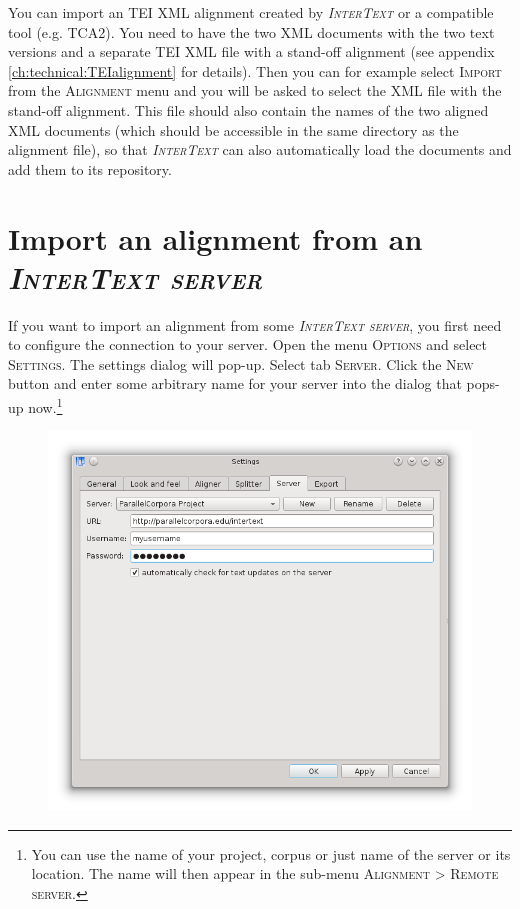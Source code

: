 \documentclass[a4paper,10pt,oneside]{book}
\newcommand{\IT}{\textit{\textsc{InterText}}\xspace}
\newcommand{\ITserver}{\textit{\textsc{InterText server}}\xspace}
\newcommand{\menu}[1]{\textsc{#1}}
\begin{document}
You can import an TEI XML alignment created by \IT or a compatible tool (e.g. TCA2). You need to have the two XML documents with the two text versions and a separate TEI XML file with a stand-off alignment (see appendix \ref{ch:technical:TEIalignment} for details). Then you can for example select \menu{Import} from the \menu{Alignment} menu and you will be asked to select the XML file with the stand-off alignment. This file should also contain the names of the two aligned XML documents (which should be accessible in the same directory as the alignment file), so that \IT can also automatically load the documents and add them to its repository.

\section{Import an alignment from an \ITserver}\label{ch:howto:importfromserver}

If you want to import an alignment from some \ITserver, you first need to configure the connection to your server. Open the menu \menu{Options} and select \menu{Settings}. The settings dialog will pop-up. Select tab \menu{Server}. Click the \menu{New} button and enter some arbitrary name for your server into the dialog that pops-up now.\footnote{You can use the name of your project, corpus or just name of the server or its location. The name will then appear in the sub-menu \menu{Alignment} > \menu{Remote server}.}

\begin{figure}[htb]
 \includegraphics[width=\textwidth]{screenshots/settings_server.png}
\end{figure}
\end{document}
